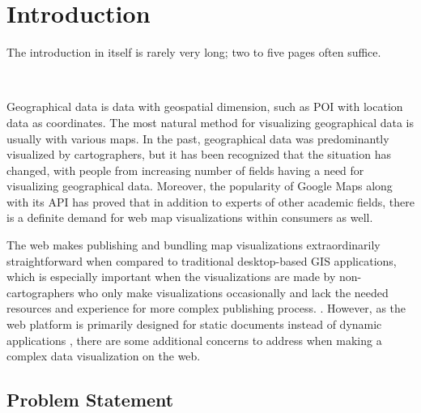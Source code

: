 
\chapter{Introduction}
\label{chapter:intro}

The introduction in itself is rarely very long; two to five pages often
suffice.

~


Geographical data is data with geospatial dimension, such as POI with location data as coordinates. The most natural method for visualizing geographical data is usually with various maps. In the past, geographical data was predominantly visualized by cartographers, but it has been recognized \citep{kraak_visualization_1999} that the situation has changed, with people from increasing number of fields having a need for visualizing geographical data. Moreover, the popularity of Google Maps \citep{google_maps_2005} along with its API \citep{google_maps_2005-1} has proved that in addition to experts of other academic fields, there is a definite demand for web map visualizations within consumers as well. 

The web makes publishing and bundling map visualizations extraordinarily straightforward when compared to traditional desktop-based GIS applications, which is especially important when the visualizations are made by non-cartographers who only make visualizations occasionally and lack the needed resources and experience for more complex publishing process. . However, as the web platform is primarily designed for static documents instead of dynamic applications \citep{berners-lee_information_1989,berners-lee_world-wide_1992}, there are some additional concerns to address when making a complex data visualization on the web.



\section{Problem Statement}


